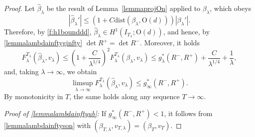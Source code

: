 \documentclass[a4paper,reqno]{amsart}
\newcommand\dist{{\mathrm{dist}}}
\theoremstyle{remark}
\newcommand{\On}{\mathrm{O}(d)}
\numberwithin{equation}{section}
\begin{document}
\begin{proof}
Let $\widehat\beta_\lambda$
 be the result of Lemma~\ref{lemmaprojOn} applied to $\beta_\lambda$, which obeys
 \begin{equation}
 |\widehat\beta_\lambda'| \le (1 + C \dist(\beta_\lambda,\On))|\beta_\lambda'|.
\end{equation}
Therefore, by \eqref{f:h1bounddd},  $\widehat\beta_\lambda \in H^1(I_{T_\lambda};\On)$, and hence, by \ref{lemmalambdainftyginfty}  $\det R^+=\det R^-$. Moreover, it holds
\begin{equation}
  F^{T_\lambda}_\lambda (\widehat \beta_\lambda,v_\lambda)\le
  \left(1+\frac{C}{\lambda^{1/4}}\right)^2
  F^{T_\lambda}_\lambda (\beta_\lambda,v_\lambda)\le
  g^*_\lambda(R^-,R^+) +\frac C{\lambda^{1/4}}+\frac1\lambda,
  \end{equation}
  and, taking $\lambda\to\infty$, we obtain
  \begin{equation}
\limsup _{\lambda\to\infty} F^{T_\lambda}_\lambda (\widehat \beta_\lambda,v_\lambda)\le
g^*_\infty(R^-,R^+).
  \end{equation}
By monotonicity in $T$, the same holds along any sequence $T\to\infty$.

\emph{Proof of \ref{lemmalambdainftyub}:}
If $g^*_\infty(R^-,R^+)<1$, it follows from \ref{lemmalambdainftyson} with $(\beta_{T,\lambda},v_{T,\lambda})=(\beta_T,v_T)$.


\end{proof}
\end{document}
